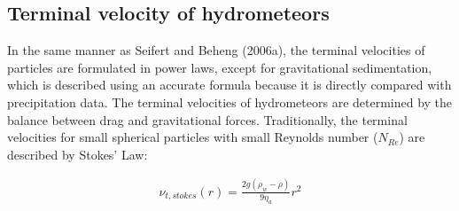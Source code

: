 \begin{table}[h]
\begin{center}
\caption{Constant parameters chosen for the generalized gamma distribution; power law coefficients used for maximum dimensions and projected area, and ranges of lower- and upper limits of mean mass.}
\label{table_sn14-1}
\end{center}
\end{table}

\subsection{Terminal velocity of hydrometeors}
In the same manner as Seifert and Beheng (2006a), the terminal velocities of particles are formulated in power laws, except for gravitational sedimentation, which is described using an accurate formula because it is directly compared with precipitation data. The terminal velocities of hydrometeors are determined by the balance between drag and gravitational forces. Traditionally, the terminal velocities for small spherical particles with small Reynolds number ($N_{Re}$) are described by Stokes’ Law:

\begin{eqnarray}
\nu_{t,stokes}(r)=\frac{2g(\rho_{w}-\rho)}{9\eta_{a}}r^{2}
\label{sn12}
\end{eqnarray}

